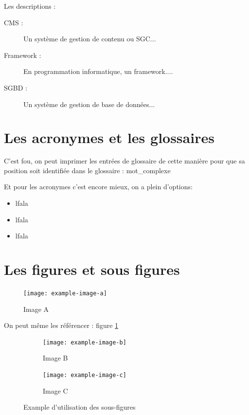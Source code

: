 \documentclass[a4paper,11pt]{report}    %
\begin{document}
\newpage

Les descriptions :
\begin{description}
	\item[CMS :] Un système de gestion de contenu ou SGC...
	\item[Framework :] En programmation informatique, un framework....
	\item[SGBD :] Un système de gestion de base de données...
\end{description}

\section{Les acronymes et les glossaires}

C'est fou, on peut imprimer les entrées de glossaire de cette manière pour que sa position soit identifiée dans le glossaire : \gls{mot_complexe}

Et pour les acronymes c'est encore mieux, on a plein d'options:
\begin{itemize}
    \item \acrshort{lfala}
        \item \acrlong{lfala}
    \item \acrfull{lfala}
\end{itemize}

\section{Les figures et sous figures}

\begin{figure}[H]
    \centering
    \texttt{[image: example-image-a]}
    \caption{Image A}
    \label{fig:example-image-a}
\end{figure}

On peut même les référencer : figure \ref{fig:example-image-a}

\begin{figure}[H]
    \begin{subfigure}[t]{0.475\textwidth}
        \texttt{[image: example-image-b]}
        \caption{Image B}
        \label{subfig:example-image-b}
    \end{subfigure}%
    \hfill
    \begin{subfigure}[t]{0.475\textwidth}
        \texttt{[image: example-image-c]}
        \caption{Image C}
        \label{subfig:example-image-c}
    \end{subfigure}
    \caption{Example d'utilisation des sous-figures}
    \label{fig:test_subfigure}
\end{figure}
\end{document}
